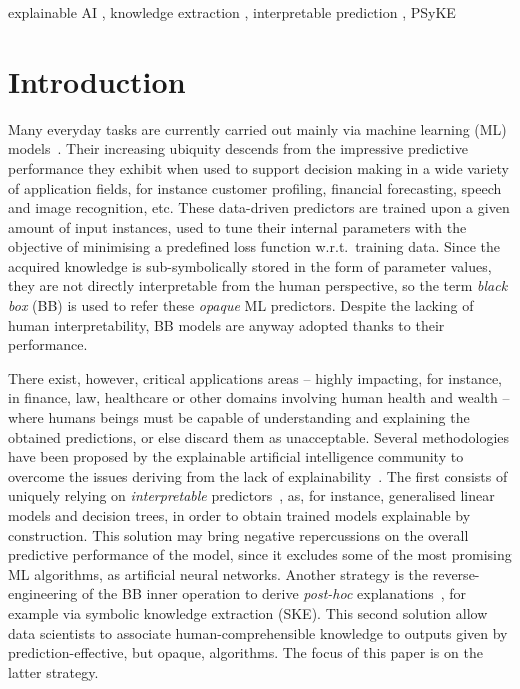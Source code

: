 \documentclass[
]{ceurart}
\begin{document}
\begin{keywords}
	explainable AI 
	\sep
  	knowledge extraction 
	\sep
	interpretable prediction 
	\sep
  	PSyKE
\end{keywords}

\maketitle

\section{Introduction}

Many everyday tasks are currently carried out mainly via machine learning (ML) models~\cite{rocha2012far}.
%
Their increasing ubiquity descends from the impressive predictive performance they exhibit when used to support decision making in a wide variety of application fields, for instance customer profiling, financial forecasting, speech and image recognition, etc.
%
These data-driven predictors are trained upon a given amount of input instances, used to tune their internal parameters with the objective of minimising a predefined loss function w.r.t.\ training data.
%
Since the acquired knowledge is sub-symbolically stored in the form of parameter values, they are not directly interpretable from the human perspective, so the term \emph{black box} (BB) is used to refer these \emph{opaque} ML predictors.
%
Despite the lacking of human interpretability, BB models are anyway adopted thanks to their performance.

There exist, however, critical applications areas -- highly impacting, for instance, in finance, law, healthcare or other domains involving human health and wealth -- where humans beings must be capable of understanding and explaining the obtained predictions, or else discard them as unacceptable.
%
Several methodologies have been proposed by the explainable artificial intelligence community to overcome the issues deriving from the lack of explainability~\cite{guidotti2018survey}.
%
The first consists of uniquely relying on \emph{interpretable} predictors~\cite{Rudin2019}, as, for instance, generalised linear models and decision trees, in order to obtain trained models explainable by construction.
%
This solution may bring negative repercussions on the overall predictive performance of the model, since it excludes some of the most promising ML algorithms, as artificial neural networks.
%
Another strategy is the reverse-engineering of the BB inner operation to derive \emph{post-hoc} explanations~\cite{KENNY2021103459}, for example via symbolic knowledge extraction (SKE).
%
This second solution allow data scientists to associate human-comprehensible knowledge to outputs given by prediction-effective, but opaque, algorithms.
%
The focus of this paper is on the latter strategy.
\end{document}
